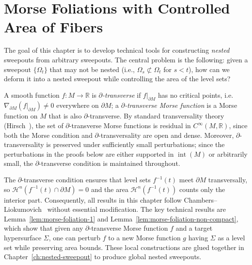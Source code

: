 \chapter{Morse Foliations with Controlled Area of Fibers}\label{ch:morse-foliation}

The goal of this chapter is to develop technical tools for constructing \emph{nested} sweepouts from arbitrary sweepouts. The central problem is the following: given a sweepout $\{\Omega_t\}$ that may not be nested (i.e., $\Omega_s \not\subset \Omega_t$ for $s < t$), how can we deform it into a nested sweepout while controlling the area of the level sets?

A smooth function $f\colon M \to \mathbb{R}$ is \emph{$\partial$-transverse}\label{def:boundary-transverse} if $f|_{\partial M}$ has no critical points, i.e.\ $\nabla_{\partial M}(f|_{\partial M}) \neq 0$ everywhere on $\partial M$; a \emph{$\partial$-transverse Morse function} is a Morse function on $M$ that is also $\partial$-transverse. By standard transversality theory (Hirsch~\cite[Chapter~4]{Hir76}), the set of $\partial$-transverse Morse functions is residual in $C^\infty(M, \mathbb{R})$, since both the Morse condition and $\partial$-transversality are open and dense. Moreover, $\partial$-transversality is preserved under sufficiently small perturbations; since the perturbations in the proofs below are either supported in $\operatorname{int}(M)$ or arbitrarily small, the $\partial$-transverse condition is maintained throughout.

The $\partial$-transverse condition ensures that level sets $f^{-1}(t)$ meet $\partial M$ transversally, so $\mathcal{H}^n(f^{-1}(t) \cap \partial M) = 0$ and the area $\mathcal{H}^n(f^{-1}(t))$ counts only the interior part. Consequently, all results in this chapter follow Chambers--Liokumovich~\cite[\S3--4]{CL20} without essential modification. The key technical results are Lemma~\ref{lem:morse-foliation-1} and Lemma~\ref{lem:morse-foliation-non-compact}, which show that given any $\partial$-transverse Morse function $f$ and a target hypersurface $\Sigma$, one can perturb $f$ to a new Morse function $g$ having $\Sigma$ as a level set while preserving area bounds. These local constructions are glued together in Chapter~\ref{ch:nested-sweepout} to produce global nested sweepouts.

